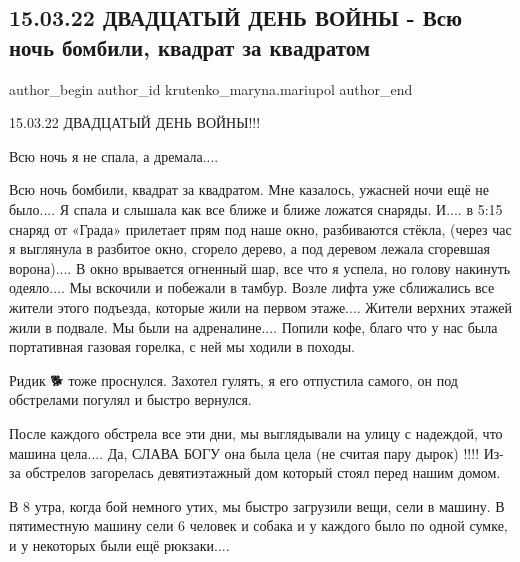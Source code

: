  
 
 
 
 

\subsection{15.03.22 ДВАДЦАТЫЙ ДЕНЬ ВОЙНЫ - Всю ночь бомбили, квадрат за квадратом}
\label{sec:15_03_2023.fb.krutenko_maryna.mariupol.1.15_03_22_dvadtsatii_}

\ifcmt
 author_begin
   author_id krutenko_maryna.mariupol
 author_end
\fi

15.03.22 ДВАДЦАТЫЙ ДЕНЬ ВОЙНЫ!!!

Всю ночь я не спала, а дремала....

Всю ночь бомбили, квадрат за квадратом. Мне казалось, ужасней ночи ещё не
было.... Я спала и слышала как все ближе и ближе ложатся снаряды. И....  в 5:15
снаряд от «Града» прилетает прям под наше окно, разбиваются стёкла, (через час
я выглянула в разбитое окно, сгорело дерево, а под деревом лежала сгоревшая
ворона).... В окно врывается огненный шар, все что я успела, но голову накинуть
одеяло.... Мы вскочили и побежали в тамбур. Возле лифта уже сближались все жители
этого подъезда, которые жили на первом этаже.... Жители верхних этажей жили в
подвале. Мы были на адреналине.... Попили кофе, благо что у нас была портативная
газовая горелка, с ней мы ходили в походы. 

Ридик 🐕 тоже проснулся. Захотел гулять, я его отпустила самого, он под
обстрелами погулял и быстро вернулся.

После каждого обстрела все эти дни, мы выглядывали на улицу с надеждой, что
машина цела.... Да, СЛАВА БОГУ она была цела (не считая пару дырок) !!!! Из-за
обстрелов загорелась девятиэтажный дом который стоял перед нашим домом. 

В 8 утра, когда бой немного утих, мы быстро загрузили вещи, сели в машину. В
пятиместную машину сели 6 человек и собака и у каждого было по одной сумке, и у
некоторых были ещё рюкзаки....

